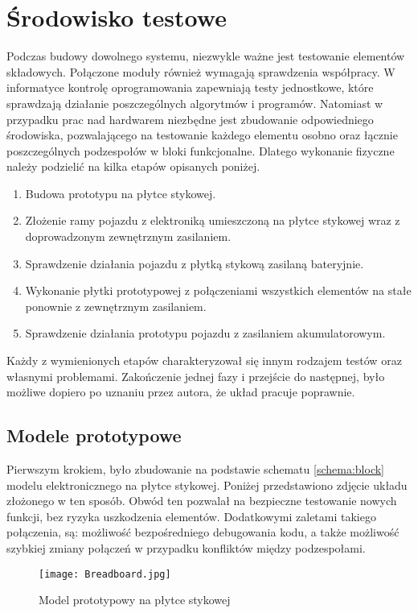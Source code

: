 \section{Środowisko testowe}
\label{sec:testing}
    Podczas budowy dowolnego systemu, niezwykle ważne jest testowanie elementów składowych.
    Połączone moduły również wymagają sprawdzenia współpracy.
    W informatyce kontrolę oprogramowania zapewniają testy jednostkowe, które sprawdzają działanie poszczególnych algorytmów i programów.
    Natomiast w przypadku prac nad hardwarem niezbędne jest zbudowanie odpowiedniego środowiska, pozwalającego na testowanie każdego elementu osobno oraz łącznie poszczególnych podzespołów w bloki funkcjonalne.
    Dlatego wykonanie fizyczne należy podzielić na kilka etapów opisanych poniżej.
    \begin{enumerate}
        \item Budowa prototypu na płytce stykowej.
        \item Złożenie ramy pojazdu z elektroniką umieszczoną na płytce stykowej wraz z doprowadzonym zewnętrznym zasilaniem.
        \item Sprawdzenie działania pojazdu z płytką stykową zasilaną bateryjnie.
        \item Wykonanie płytki prototypowej z połączeniami wszystkich elementów na stałe ponownie z zewnętrznym zasilaniem.
        \item Sprawdzenie działania prototypu pojazdu z zasilaniem akumulatorowym.
    \end{enumerate}
    Każdy z wymienionych etapów charakteryzował się innym rodzajem testów oraz własnymi problemami.
    Zakończenie jednej fazy i przejście do następnej, było możliwe dopiero po uznaniu przez autora, że układ pracuje poprawnie.

    \subsection{Modele prototypowe}
        Pierwszym krokiem, było zbudowanie na podstawie schematu \ref{schema:block} modelu elektronicznego na płytce stykowej.
        Poniżej przedstawiono zdjęcie układu złożonego w ten sposób.
        Obwód ten pozwalał na bezpieczne testowanie nowych funkcji, bez ryzyka uszkodzenia elementów.
        Dodatkowymi zaletami takiego połączenia, są: możliwość bezpośredniego debugowania kodu, a także możliwość szybkiej zmiany połączeń w przypadku konfliktów między podzespołami.
        \begin{figure}[!ht]
            \centering
            \texttt{[image: Breadboard.jpg]}
            \caption{Model prototypowy na płytce stykowej}
            \label{fig:breadboard}
        \end{figure}

